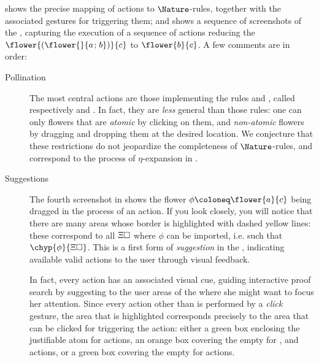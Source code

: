 \begin{scope}
 shows the precise mapping of \Proof actions to
$\Nature$-rules, together with the associated gestures for triggering them; and
 shows a sequence of screenshots of the , capturing the execution of a sequence of \Proof actions reducing the
 $\flower{(\flower{}{a \sep b})}{c}$ to $\flower{b}{c}$. A few
comments are in order:

\begin{description}
  \item[Pollination] The most central actions are those implementing
  the  rules  and , called respectively
   and . In fact, they are \emph{less} general
  than those rules: one can only  flowers that are \emph{atomic}
  by clicking on them, and  \emph{non-atomic} flowers by dragging
  and dropping them at the desired location. We conjecture that these
  restrictions do not jeopardize the completeness of $\Nature$-rules, and
  correspond to the process of $\eta$-expansion in .
  
  \item[Suggestions]
  
  The fourth screenshot in  shows the flower $\phi
  \deq \flower{a}{c}$ being dragged in the process of an  action.
  If you look closely, you will notice that there are many areas whose border is
  highlighted with dashed yellow lines: these correspond to all 
  $\Xi\square$ where $\phi$ can be imported, i.e. such that
  $\chyp{\phi}{\Xi\hole}$. This is a first form of \emph{suggestion} in the
  , indicating available valid actions to the user through visual
  feedback.

  In fact, every \Proof action has an associated visual cue, guiding interactive
  proof search by suggesting to the user areas of the  where she might want
  to focus her attention. Since every action other than  is
  performed by a \emph{click} gesture, the area that is highlighted corresponds
  precisely to the area that can be clicked for triggering the action: either a
  green box enclosing the justifiable atom for  actions, an
  orange box covering the empty  for ,  and
   actions, or a green box covering the empty  for
   actions.
  

\end{description}
\end{scope}
